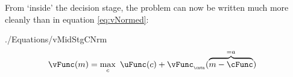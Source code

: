 \documentclass[SolvingMicroDSOPs]{subfiles}
\begin{document}
From `inside' the decision stage, the {\Decision} problem can now be written much more cleanly than in equation \eqref{eq:vNormed}:
\begin{verbatimwrite}{./Equations/vMidStgCNrm}
  \begin{equation}\begin{gathered}\begin{aligned}
        \vFunc(\mNrm) & = \max_{\cNrm}~ \uFunc(\cNrm) + \vFunc_{_\cntn}(\overbrace{\mNrm-\cFunc}^{=\aNrm}) \label{eq:vMidStgCNrm}
      \end{aligned}\end{gathered}\end{equation}
\end{verbatimwrite}
\unskip


\begin{comment} 

  \subsection{Implementation in Python}

  The code implementing the tasks outlined each of the sections to come is available in the \texttt{\href{https://econ-ark.org/materials/SolvingMicroDSOPs}{SolvingMicroDSOPs}} jupyter notebook, written in \href{https://python.org}{Python}. The notebook imports various modules, including the standard \texttt{numpy} and \texttt{scipy} modules used for numerical methods in Python, as well as some user-defined modules designed to provide numerical solutions to the consumer's problem from the previous section. Before delving into the computational exercise, it is essential to touch on the practicality of these custom modules.

  \subsubsection{Useful auxilliary files}

  In this exercise, two primary user-defined modules are frequently imported and utilized. The first is the \texttt{gothic\_class} module, which contains functions describing the end-of-period value functions found in equations \eqref{eq:vBegStg} - \eqref{eq:EndPrd} (and the corresponding first and second derivatives). %

  The \texttt{resources} module is also used repeatedly throughout the notebook. This file has three primary objectives: (i) providing functions that discretize the continuous distributions from the theoretical model that describe the uncertainty a consumer faces, (ii) defining the utility function over consumption under a number of specifications, and (iii) enhancing the grid of end-of-period assets for which functions (such as those from the \texttt{gothic\_class} module) will be defined. These objectives will be discussed in greater detail and with respect to the numerical methods used to the problem in subsequent sections of this document.

\end{comment}
\end{document}
